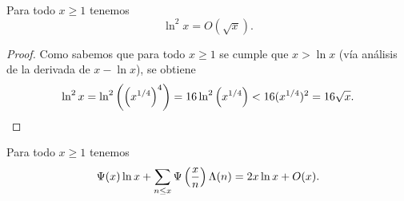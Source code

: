 \begin{lemma}
  \label{lem:ln2x-is-sqrtx}
  Para todo \(x \geq 1\) tenemos
  \[
    \ln^2 x = O(\sqrt{x}).
  \]
\end{lemma}

\begin{proof}
  Como sabemos que para todo \(x \geq 1\) se cumple que \(x > \ln x\)
  (v\'ia an\'alisis de la  derivada de \(x - \ln x\)), se obtiene
  \[
    \ln^2 x
    = \ln^2 \left( \left( x^{1/4} \right)^4 \right)
    = 16 \ln^2 \left( x^{1/4} \right)
    < 16 (x^{1/4})^2
    = 16 \sqrt{x}.
  \]
\end{proof}

\begin{lemma}
  \label{lem:psi-2xlnx-ox}
  Para todo \(x \geq 1\) tenemos
  \[
    \Psi(x) \ln x + \sum_{n \leq x}
    \Psi\left( \frac{x}{n} \right)\Lambda(n) = 2x\ln x + O(x).
  \]
\end{lemma}

